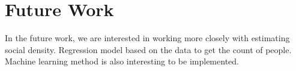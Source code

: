 \chapter{Future Work}\label{ch:future-work} %
In the future work, we are interested in working more closely with estimating social density. Regression model based on the data to get the count of people. Machine learning method is also interesting to be implemented.
